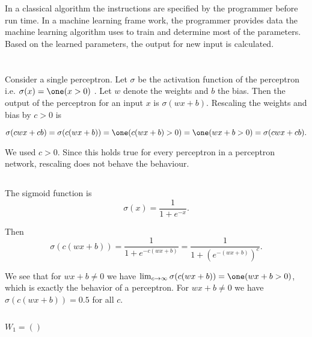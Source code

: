\documentclass{article}
\begin{document}
\section{}
In a classical algorithm the instructions are specified by the programmer before run time. In a machine learning frame work, the programmer provides data the machine learning algorithm uses to train and determine most of the parameters. Based on the learned parameters, the output for new input is calculated.
\section{}
\section{}
\section{}
\subsection{}
Consider a single perceptron. Let $\sigma$ be the activation function of the perceptron i.e. $\sigma(x)= \one (x >0)$ . Let $w$ denote the weights and $b$ the bias. Then the output of the perceptron for an input $x$ is $\sigma(w x +b)$. Rescaling the weights and bias by $c>0$ is 

$$\sigma(cw x +cb)=\sigma(c(w x +b))= \one (c(w x +b) >0)= \one (w x +b >0)=\sigma(cw x +cb).$$

We used $c>0$. Since this holds true for every perceptron in a perceptron network, rescaling does not behave the behaviour. 
\subsection{}
The sigmoid function is
$$\sigma(x)=\frac{1}{1+e^{-x}}.$$

Then 
$$\sigma(c(w x +b))=\frac{1}{1+e^{-c(w x +b)}}=\frac{1}{1+(e^{-(w x +b)})^c}.$$

We see that for $w x +b\neq 0$ we have $\lim_{c\to \infty}\sigma(c(w x +b))=\one (w x +b >0)$, which is exactly the behavior of a perceptron. For $w x +b\neq 0$ we have $\sigma(c(w x +b))=0.5$ for all $c$.
\subsection{}
$W_1 = ()$
\end{document}
